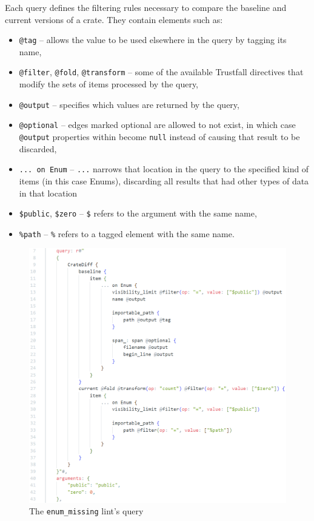 \documentclass[licencjacka,en]{pracamgr}
\begin{document}
Each query defines the filtering rules necessary to compare the baseline and current versions of
a crate. They contain elements such as:
\begin{itemize}
	\item \texttt{@tag} -- allows the value to be used elsewhere in the query by
		tagging its name,
	\item \texttt{@filter}, \texttt{@fold}, \texttt{@transform} -- some of the available Trustfall
		directives that modify the sets of items processed by the query,
	\item \texttt{@output} -- specifies which values are returned by the query,
	\item \texttt{@optional} -- edges marked optional are allowed to not exist, in which case
		\texttt{@output} properties within become \texttt{null} instead of causing that result
		to be discarded,
	\item \texttt{... on Enum} -- \texttt{...} narrows that location in the query to the specified
		kind of items (in this case Enums), discarding all results that had other types of data
		in that location
	\item \texttt{\$public}, \texttt{\$zero} -- \texttt{\$} refers to the argument with the same
		name,
	\item \texttt{\%path} -- \texttt{\%} refers to a tagged element with the same name.
\end{itemize}

\begin{figure}[h]
	\centering
	\includegraphics[width=\linewidth]{lint-query-example.png}
	\caption{The \texttt{enum\_missing} lint's query}
	\label{fig:enum_missing_lint_query}
\end{figure}
\end{document}
